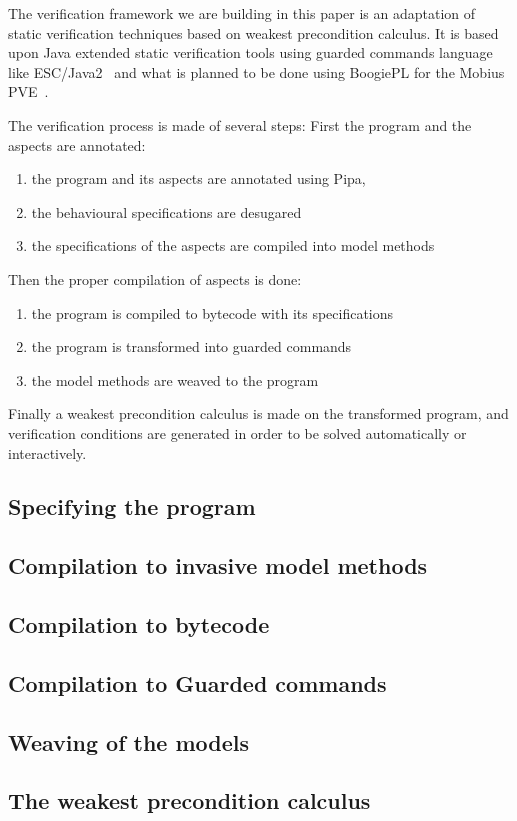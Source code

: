 The verification framework we are building in this paper is an
adaptation of static verification techniques based on weakest
precondition calculus. It is based upon Java extended static verification
tools using guarded commands language like ESC/Java2~\cite{CokK04} and
what is planned to be done using BoogiePL for the Mobius
PVE~\cite{MobiusPVE07}.


The verification process is made of several steps:
First the program and the aspects are annotated:
\begin{enumerate}
\item the program and its aspects are annotated using Pipa,
\item the behavioural specifications are desugared
\item the specifications of the aspects are compiled into model
methods
\end{enumerate}
Then the proper compilation of aspects is done:
\begin{enumerate}
\item the program is compiled to bytecode with its specifications
\item the program is transformed into guarded commands
\item the model methods are weaved to the program
\end{enumerate}
Finally a weakest precondition calculus is made on the transformed
program, and verification conditions are generated in order to be
solved automatically or interactively.


\subsection{Specifying the program}


\subsection{Compilation to invasive model methods}


\subsection{Compilation to bytecode}


\subsection{Compilation to Guarded commands}
\label{gc}


\subsection{Weaving of the models}


\subsection{The weakest precondition calculus}
